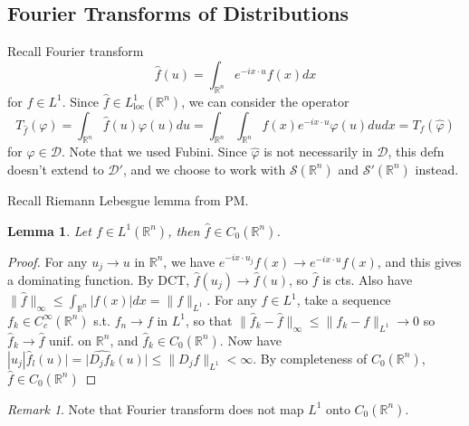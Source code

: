 \documentclass{article}
\theoremstyle{definition}
\theoremstyle{remark}
\newtheorem{rem}{Remark}
\theoremstyle{plain}
\newtheorem{lem}[defn]{Lemma}
\newcommand{\RR}{\mathbb{R}}
\newcommand{\calD}{\mathcal{D}}
\begin{document}
\subsection{Fourier Transforms of Distributions}
Recall Fourier transform \[\hat f(u)=\int_{\RR^n}e^{-ix\cdot u}f(x)dx\]
for $f\in L^1$. Since $\hat f\in L^1_{\text{loc}}(\RR^n)$, we can consider the operator
\[T_{\hat f}(\varphi)=\int_{\RR^n}\hat f(u)\varphi(u)du=\int_{\RR^n}\int_{\RR^n}f(x)e^{-ix\cdot u}\varphi(u)dudx=T_f(\hat\varphi)\] for $\varphi\in\calD$. Note that we used Fubini.
Since $\hat\varphi$ is not necessarily in $\calD$, this defn doesn't extend to $\calD'$, and we choose to work with $\mathcal S(\RR^n)$ and $\mathcal S'(\RR^n)$ instead.

Recall Riemann Lebesgue lemma from PM.
\begin{lem}
    Let $f\in L^1(\RR^n)$, then $\hat f\in C_0(\RR^n)$.
\end{lem}
\begin{proof}
    For any $u_j\to u$ in $\RR^n$, we have $e^{-ix\cdot u_j}f(x)\to e^{-ix\cdot u}f(x)$, and this gives a dominating function. By DCT, $\hat f(u_j)\to \hat f(u)$, so $\hat f$ is cts.
    Also have $\|\hat f\|_\infty\le \int_{\RR^n}|f(x)|dx=\|f\|_{L^1}$. For any $f\in L^1$, take a sequence $f_k\in C^\infty_c(\RR^n)$ s.t. $f_n\to f$ in $L^1$, so that $\|\hat f_k-\hat f\|_\infty\le \|f_k-f\|_{L^1}\to 0$ so $\hat f_k\to \hat f$ unif. on $\RR^n$, and $\hat f_k\in C_0(\RR^n)$. Now have $|u_j|\hat f_l(u)|=|\hat{D_jf_k}(u)|\le \|D_jf\|_{L^1}<\infty$. By completeness of $C_0(\RR^n)$, $\hat f\in C_0(\RR^n)$
\end{proof}
\begin{rem}
    Note that Fourier transform does not map $L^1$ onto $C_0(\RR^n)$.
\end{rem}
\end{document}
